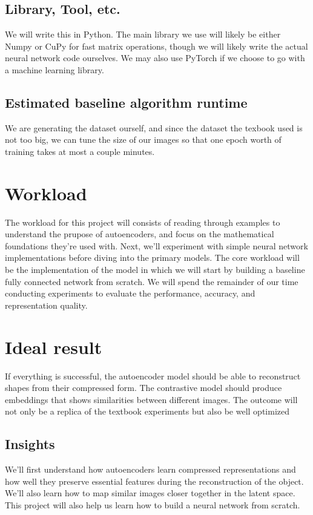 \documentclass{article}
\begin{document}
\subsection{Library, Tool, etc.}
We will write this in Python.  The main library we use will likely be either Numpy or CuPy for fast matrix operations, though we will likely write the actual neural network code ourselves.  We may also use PyTorch if we choose to go with a machine learning library.

\subsection{Estimated baseline algorithm runtime}

We are generating the dataset ourself, and since the dataset the texbook used is not too big, we can tune the size of our images so that one epoch worth of training takes at most a couple minutes.

\section{Workload}
{\color{black}
The workload for this project will consists of reading through examples to understand the prupose of autoencoders, and focus on the mathematical foundations they're used with. Next, we'll experiment with simple neural network implementations before diving into the primary models. The core workload will be the implementation of the model in which we will start by building a baseline fully connected network from scratch. We will spend the remainder of our time conducting experiments to evaluate the performance, accuracy, and representation quality.}


\section{Ideal result}
{\color{black}
If everything is successful, the autoencoder model should be able to reconstruct shapes from their compressed form. The contrastive model should produce embeddings that shows similarities between different images. The outcome will not only be a replica of the textbook experiments but also be well optimized
}

\subsection{Insights}
{\color{black}
We'll first understand how autoencoders learn compressed representations and how well they preserve essential features during the reconstruction of the object. We'll also learn how to map similar images closer together in the latent space. This project will also help us learn how to build a neural network from scratch.
}
\end{document}
